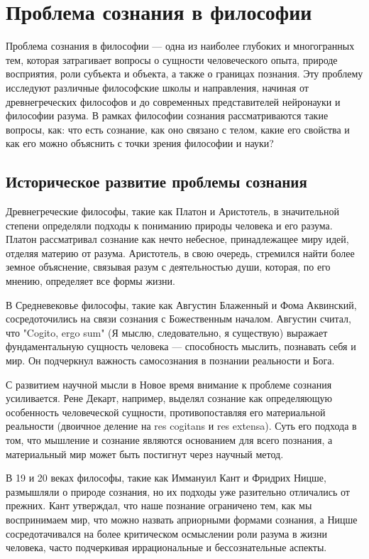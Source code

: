 \documentclass[12pt,a4paper]{article}
\begin{document}
	\section{Проблема сознания в философии~\checkmark}
	Проблема сознания в философии — одна из наиболее глубоких и многогранных тем, которая затрагивает вопросы о сущности человеческого опыта, природе восприятия, роли субъекта и объекта, а также о границах познания. Эту проблему исследуют различные философские школы и направления, начиная от древнегреческих философов и до современных представителей нейронауки и философии разума. В рамках философии сознания рассматриваются такие вопросы, как: что есть сознание, как оно связано с телом, какие его свойства и как его можно объяснить с точки зрения философии и науки?
	
	\subsection{Историческое развитие проблемы сознания}
	Древнегреческие философы, такие как Платон и Аристотель, в значительной степени определяли подходы к пониманию природы человека и его разума. Платон рассматривал сознание как нечто небесное, принадлежащее миру идей, отделяя материю от разума. Аристотель, в свою очередь, стремился найти более земное объяснение, связывая разум с деятельностью души, которая, по его мнению, определяет все формы жизни.
	
	В Средневековье философы, такие как Августин Блаженный и Фома Аквинский, сосредоточились на связи сознания с Божественным началом. Августин считал, что "Cogito, ergo sum" (Я мыслю, следовательно, я существую) выражает фундаментальную сущность человека — способность мыслить, познавать себя и мир. Он подчеркнул важность самосознания в познании реальности и Бога.
	
	С развитием научной мысли в Новое время внимание к проблеме сознания усиливается. Рене Декарт, например, выделял сознание как определяющую особенность человеческой сущности, противопоставляя его материальной реальности (двоичное деление на res cogitans и res extensa). Суть его подхода в том, что мышление и сознание являются основанием для всего познания, а материальный мир может быть постигнут через научный метод.
	
	В 19 и 20 веках философы, такие как Иммануил Кант и Фридрих Ницше, размышляли о природе сознания, но их подходы уже разительно отличались от прежних. Кант утверждал, что наше познание ограничено тем, как мы воспринимаем мир, что можно назвать априорными формами сознания, а Ницше сосредотачивался на более критическом осмыслении роли разума в жизни человека, часто подчеркивая иррациональные и бессознательные аспекты.
	
\end{document}
